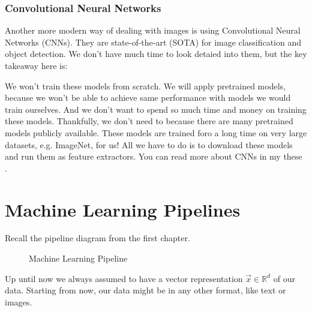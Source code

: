 \documentclass[a4paper]{article}
\begin{document}
\subsubsection{Convolutional Neural Networks}
Another more modern way of dealing with images is using Convolutional Neural Networks (CNNs).
They are state-of-the-art (SOTA) for image classification and object detection.
We don't have much time to look detaied into them, but the key takeaway here is:

We won't train these models from scratch. We will apply pretrained models, because we won't
be able to achieve same performance with models we would train ourselves.
And we don't want to spend so much time and money on training these models.
Thankfully, we don't need to because there are many pretrained models publicly available.
These models are trained foro a long time on very large datasets, e.g. ImageNet\cite{deng2009imagenet}, for us!
All we have to do is to download these models and run them as feature extractors.
You can read more about CNNs in my these \cite{PhilippZettl:2022}.

\section{Machine Learning Pipelines}
Recall the pipeline diagram from the first chapter.

\begin{figure}[h]
  \centering
  \caption{Machine Learning Pipeline}
  \label{fig:ml-pipeline}
\end{figure}
Up until now we always assumed to have a vector representation $\vec{x}\in\mathbb{R}^d$ of our data.
Starting from now, our data might be in any other format, like text or images.
\end{document}
